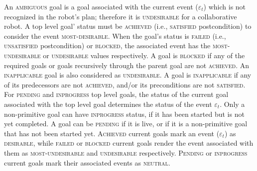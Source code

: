 An \textsc{ambiguous} goal is a goal associated with the current event
($\varepsilon_t$) which is not recognized in the robot's plan; therefore it is
\textsc{undesirable} for a collaborative robot. A top level goal' status must be
\textsc{achieved} (i.e., \textsc{satisfied} postcondition) to consider the event
\textsc{most-desirable}. When the goal's status is \textsc{failed} (i.e.,
\textsc{unsatisfied} postcondition) or \textsc{blocked}, the associated event
has the \textsc{most-undesirable} or \textsc{undesirable} values respectively.
A goal is \textsc{blocked} if any of the required goals or goals recursively
through the parent goal are not \textsc{achieved}. An \textsc{inapplicable} goal
is also considered as \textsc{undesirable}. A goal is \textsc{inapplicable} if
any of its predecessors are not \textsc{achieved}, and/or its preconditions are
not \textsc{satisfied}. For \textsc{pending} and \textsc{inprogress} top level
goals, the status of the current goal associated with the top level goal
determines the status of the event $\varepsilon_t$. Only a non-primitive goal
can have \textsc{inprogress} status, if it has been started but is not yet
completed. A goal can be \textsc{pending} if it is live, or if it is a
non-primitive goal that has not been started yet. \textsc{Achieved} current
goals mark an event ($\varepsilon_t$) as \textsc{desirable}, while
\textsc{failed} or \textsc{blocked} current goals render the event associated
with them as \textsc{most-undesirable} and \textsc{undesirable} respectively.
\textsc{Pending} or \textsc{inprogress} current goals mark their associated
events as \textsc{neutral}.

